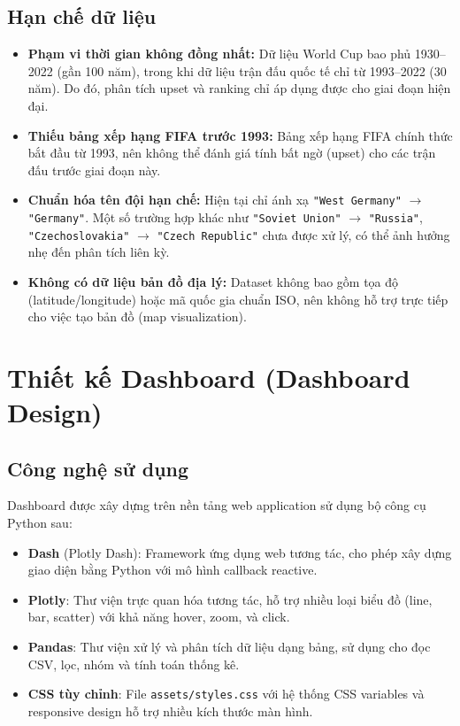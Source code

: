 \documentclass[12pt,a4paper]{article}
\begin{document}
\subsection{Hạn chế dữ liệu}
\begin{itemize}
    \item \textbf{Phạm vi thời gian không đồng nhất:} Dữ liệu World Cup bao phủ 1930--2022 (gần 100 năm), trong khi dữ liệu trận đấu quốc tế chỉ từ 1993--2022 (30 năm). Do đó, phân tích upset và ranking chỉ áp dụng được cho giai đoạn hiện đại.
    \item \textbf{Thiếu bảng xếp hạng FIFA trước 1993:} Bảng xếp hạng FIFA chính thức bắt đầu từ 1993, nên không thể đánh giá tính bất ngờ (upset) cho các trận đấu trước giai đoạn này.
    \item \textbf{Chuẩn hóa tên đội hạn chế:} Hiện tại chỉ ánh xạ \texttt{"West Germany"} $\rightarrow$ \texttt{"Germany"}. Một số trường hợp khác như \texttt{"Soviet Union"} $\rightarrow$ \texttt{"Russia"}, \texttt{"Czechoslovakia"} $\rightarrow$ \texttt{"Czech Republic"} chưa được xử lý, có thể ảnh hưởng nhẹ đến phân tích liên kỳ.
    \item \textbf{Không có dữ liệu bản đồ địa lý:} Dataset không bao gồm tọa độ (latitude/longitude) hoặc mã quốc gia chuẩn ISO, nên không hỗ trợ trực tiếp cho việc tạo bản đồ (map visualization).
\end{itemize}


\newpage
\section{Thiết kế Dashboard (Dashboard Design)}

\subsection{Công nghệ sử dụng}
Dashboard được xây dựng trên nền tảng web application sử dụng bộ công cụ Python sau:
\begin{itemize}
    \item \textbf{Dash} (Plotly Dash): Framework ứng dụng web tương tác, cho phép xây dựng giao diện bằng Python với mô hình callback reactive.
    \item \textbf{Plotly}: Thư viện trực quan hóa tương tác, hỗ trợ nhiều loại biểu đồ (line, bar, scatter) với khả năng hover, zoom, và click.
    \item \textbf{Pandas}: Thư viện xử lý và phân tích dữ liệu dạng bảng, sử dụng cho đọc CSV, lọc, nhóm và tính toán thống kê.
    \item \textbf{CSS tùy chỉnh}: File \texttt{assets/styles.css} với hệ thống CSS variables và responsive design hỗ trợ nhiều kích thước màn hình.
\end{itemize}
\end{document}
